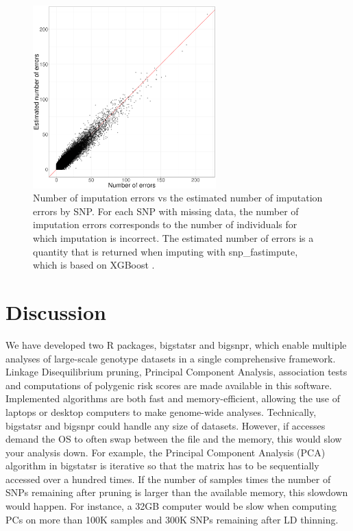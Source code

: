 \documentclass{bioinfo}
\begin{document}
\begin{figure}[!tpb]
\centerline{\includegraphics[width=200pt]{error-impute}}
\caption{Number of imputation errors vs the estimated number of imputation errors by SNP. For each SNP with missing data, the number of imputation errors corresponds to the number of individuals for which imputation is incorrect. The estimated number of errors is a quantity that is returned when imputing with snp\_fastimpute, which is based on XGBoost \cite[]{Chen2016}.}\label{fig:error-impute}
\end{figure}

\section{Discussion}

We have developed two R packages, bigstatsr and bigsnpr, which enable multiple analyses of large-scale genotype datasets in a single comprehensive framework. Linkage Disequilibrium pruning, Principal Component Analysis, association tests and computations of polygenic risk scores are made available in this software. Implemented algorithms are both fast and memory-efficient, allowing the use of laptops or desktop computers to make genome-wide analyses. Technically, bigstatsr and bigsnpr could handle any size of datasets. However, if accesses demand the OS to often swap between the file and the memory, this would slow your analysis down. For example, the Principal Component Analysis (PCA) algorithm in bigstatsr is iterative so that the matrix has to be sequentially accessed over a hundred times. If the number of samples times the number of SNPs remaining after pruning is larger than the available memory, this slowdown would happen. For instance, a 32GB computer would be slow when computing PCs on more than 100K samples and 300K SNPs remaining after LD thinning.
\end{document}
